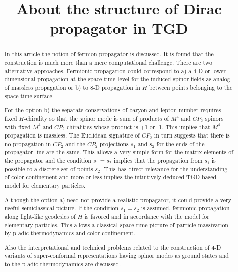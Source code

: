 \documentclass[10pt,epsf]{article}
\title{{\bf About the structure of Dirac propagator in TGD}} \author{}
\begin{document}
\maketitle




\begin{abstract}

In this article the notion of fermion propagator  is discussed. It is found that the construction is much more than a mere computational challenge. There are two alternative approaches. Fermionic propagation could correspond to a) a 4-D  or lower-dimensional propagation at the space-time level for the induced spinor fields as analog of massless propagation or b) to 8-D propagation in $H$ between points belonging to the space-time surface. 

For the option b) the separate conservations of baryon and lepton number requires fixed $H$-chirality so that the spinor mode is sum of products of $M^4$ and $CP_2$ spinors with fixed $M^4$ and $CP_2$ chiralities whose product is +1 or -1.  This implies that $M^4$ propagation is massless. The Euclidean signature of $CP_2$ in turn suggests that there is no propagation in $CP_2$ and the $CP_2$ projections  $s_1$ and $s_2$ for the ends of the propagator line are the same. This allows a very simple form for the matrix elements of the propagator and the condition  $s_1=s_2$ implies that the propagation from $s_1$ is possible to    a discrete set of points $s_2$. This has direct relevance for the understanding of color confinement and more or less implies the intuitively deduced TGD based model for elementary particles.

Although the option a) need not provide a realistic propagator, it could provide a very useful semiclassical picture. If the condition $s_1=s_2$ is assumed, fermionic propagation along light-like geodesics of $H$ is favored and in accordance with the model for elementary particles. This allows a classical  space-time picture of particle massivation by p-adic thermodynamics and    color confinement.


Also the interpretational and technical  problems related to the construction of 4-D variants of super-conformal representations having spinor modes as ground states and to the p-adic thermodynamics are discussed.

\end{abstract}

\tableofcontents
\end{document}
